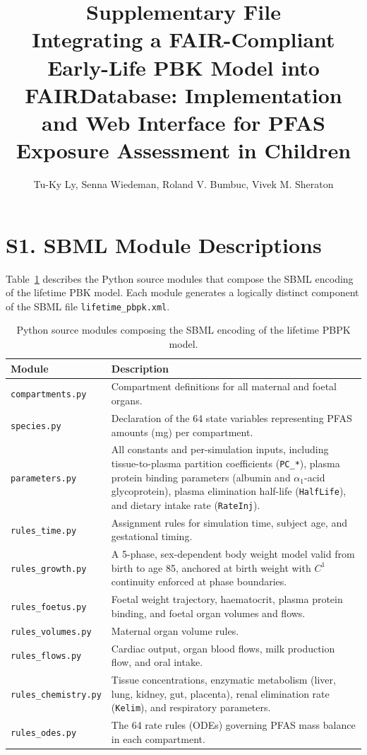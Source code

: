 \documentclass[12pt]{article}
\title{\textbf{Supplementary File}\\[0.5em]
\large Integrating a FAIR-Compliant Early-Life PBK Model into
FAIRDatabase: Implementation and Web Interface for PFAS Exposure
Assessment in Children}
\author{Tu-Ky Ly, Senna Wiedeman, Roland V. Bumbuc, Vivek M. Sheraton}
\date{}
\begin{document}
\maketitle
\tableofcontents
\newpage

\section*{S1. SBML Module Descriptions}

Table~\ref{tab:sbml_modules} describes the Python source modules that
compose the SBML encoding of the lifetime PBK model. Each module
generates a logically distinct component of the SBML file
\texttt{lifetime\_pbpk.xml}.

\begin{table}[h]
\centering
\caption{Python source modules composing the SBML encoding of the
lifetime PBPK model.}
\label{tab:sbml_modules}
\begin{tabular}{p{3.8cm} p{9.5cm}}
\toprule
\textbf{Module} & \textbf{Description} \\
\midrule
\texttt{compartments.py}
& Compartment definitions for all maternal and foetal organs. \\
\texttt{species.py}
& Declaration of the 64 state variables representing PFAS
  amounts (mg) per compartment. \\
\texttt{parameters.py}
& All constants and per-simulation inputs, including
  tissue-to-plasma partition coefficients (\texttt{PC\_*}),
  plasma protein binding parameters (albumin and
  $\alpha_1$-acid glycoprotein), plasma elimination half-life
  (\texttt{HalfLife}), and dietary intake rate
  (\texttt{RateInj}). \\
\texttt{rules\_time.py}
& Assignment rules for simulation time, subject age, and
  gestational timing. \\
\texttt{rules\_growth.py}
& A 5-phase, sex-dependent body weight model valid from birth
  to age 85, anchored at birth weight with $C^1$ continuity
  enforced at phase boundaries. \\
\texttt{rules\_foetus.py}
& Foetal weight trajectory, haematocrit, plasma protein
  binding, and foetal organ volumes and flows. \\
\texttt{rules\_volumes.py}
& Maternal organ volume rules. \\
\texttt{rules\_flows.py}
& Cardiac output, organ blood flows, milk production flow,
  and oral intake. \\
\texttt{rules\_chemistry.py}
& Tissue concentrations, enzymatic metabolism (liver, lung,
  kidney, gut, placenta), renal elimination rate
  (\texttt{Kelim}), and respiratory parameters. \\
\texttt{rules\_odes.py}
& The 64 rate rules (ODEs) governing PFAS mass balance in
  each compartment. \\
\bottomrule
\end{tabular}
\end{table}
\end{document}
